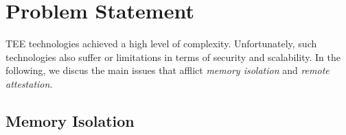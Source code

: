 %



\section{Problem Statement}

TEE technologies achieved a high level of complexity.
Unfortunately, such technologies also suffer or limitations in terms of 
security and scalability.
In the following, we discus the main issues that afflict \emph{memory 
isolation} and \emph{remote attestation}. 

\subsection{Memory Isolation}

